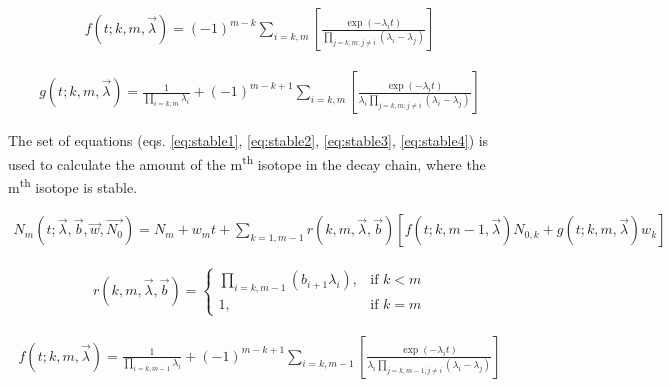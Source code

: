 \begin{equation}
\begin{split}
f(t;k,m,\vec{\lambda})
=
(-1)^{m-k}
\sum_{i=k,m}
\left[
\frac{\exp(-\lambda_i t)}{\prod_{j=k,m;j\neq i}\left(\lambda_i-\lambda_j\right )}
\right ]
\end{split}
\label{eq:unstable3}
\end{equation}

\begin{equation}
\begin{split}
g(t;k,m,\vec{\lambda})
= \frac{1}{\prod_{i=k,m} \lambda_i }
+ \left( -1 \right)^{m-k+1}
\sum_{i=k,m}
\left[
\frac{\exp(-\lambda_i t)}{\lambda_i \prod_{j=k,m;j\neq i}\left(\lambda_i - \lambda_j\right )}
\right]
\end{split}
\label{eq:unstable4}
\end{equation}

The set of equations (eqs. \ref{eq:stable1}, \ref{eq:stable2}, \ref{eq:stable3}, \ref{eq:stable4}) is used to calculate the amount of the m\textsuperscript{th} isotope in the decay chain, where the m\textsuperscript{th} isotope is stable.

\begin{equation}
\begin{split}
N_{m}(t; \vec{\lambda}, \vec{b}, \vec{w}, \vec{N_{0}})
= N_{m} + w_{m} t +
\sum_{k=1,m-1} r(k, m, \vec{\lambda}, \vec{b}) \left[ f(t; k,m-1,\vec{\lambda}) N_{0,k} + g(t;k,m,\vec{\lambda}) w_{k} \right ]
\end{split}
\label{eq:stable1}
\end{equation}

\begin{equation}
\begin{split}
r(k,m,\vec{\lambda}, \vec{b}) =
\begin{cases}
\prod_{i=k,m-1} \left( b_{i+1} \lambda_{i} \right) , & \text{if } k < m\\
1, & \text{if }k = m
\end{cases}
\end{split}
\label{eq:stable2}
\end{equation}

\begin{equation}
\begin{split}
f(t;k,m,\vec{\lambda})
= \frac{1}{\prod_{i=k,m-1} \lambda_i }
+ \left( -1 \right)^{m-k+1}
\sum_{i=k,m-1}
\left[
\frac{\exp(-\lambda_i t)}{\lambda_i \prod_{j=k,m-1;j\neq i}
\left({\lambda_i - \lambda_j}
\right )}
\right]
\end{split}
\label{eq:stable3}
\end{equation}

